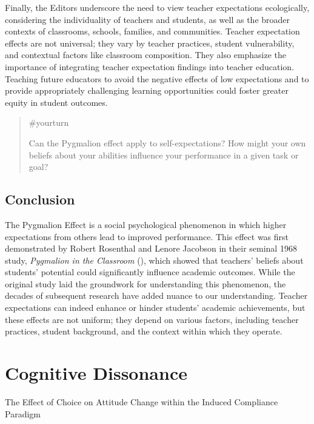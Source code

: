 \documentclass[
  letterpaper,
]{book}
\begin{document}
Finally, the Editors underscore the need to view teacher expectations
ecologically, considering the individuality of teachers and students, as
well as the broader contexts of classrooms, schools, families, and
communities. Teacher expectation effects are not universal; they vary by
teacher practices, student vulnerability, and contextual factors like
classroom composition. They also emphasize the importance of integrating
teacher expectation findings into teacher education. Teaching future
educators to avoid the negative effects of low expectations and to
provide appropriately challenging learning opportunities could foster
greater equity in student outcomes.

\begin{quote}
{\#yourturn}

Can the Pygmalion effect apply to self-expectations? How might your own
beliefs about your abilities influence your performance in a given task
or goal?
\end{quote}

\section{Conclusion}\label{conclusion}

The Pygmalion Effect is a social psychological phenomenon in which
higher expectations from others lead to improved performance. This
effect was first demonstrated by Robert Rosenthal and Lenore Jacobson in
their seminal 1968 study, \emph{Pygmalion in the Classroom}
(),
which showed that teachers' beliefs about students' potential could
significantly influence academic outcomes. While the original study laid
the groundwork for understanding this phenomenon, the decades of
subsequent research have added nuance to our understanding. Teacher
expectations can indeed enhance or hinder students' academic
achievements, but these effects are not uniform; they depend on various
factors, including teacher practices, student background, and the
context within which they operate.


\chapter{\texorpdfstring{{Cognitive
Dissonance}}{Cognitive Dissonance}}\label{cognitive-dissonance}

The Effect of Choice on Attitude Change within the Induced Compliance
Paradigm
\end{document}
